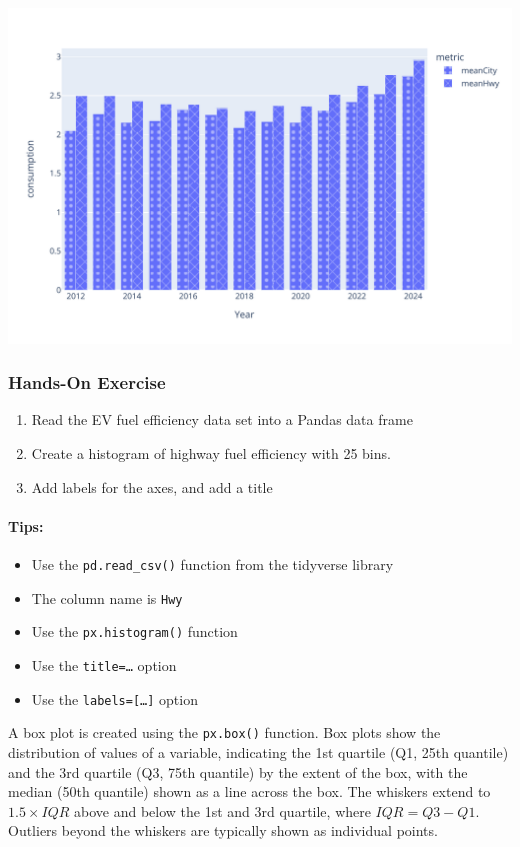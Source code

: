 \begin{center}
  \includegraphics[width=.8\textwidth]{px.fuel.columnsPatterns.pdf}
\end{center}


\begin{tcolorbox}[colback=code]
\subsubsection*{Hands-On Exercise}
\begin{enumerate}
    \item Read the EV fuel efficiency data set into a Pandas data frame
    \item Create a histogram of highway fuel efficiency with 25 bins.
    \item Add labels for the axes, and add a title
\end{enumerate}

\paragraph*{Tips:}
    \begin{itemize} 
	   \item Use the \texttt{pd.read\_csv()} function from the tidyverse library
       \item The column name is \texttt{Hwy}
       \item Use the \texttt{px.histogram()} function
       \item Use the \texttt{title=\ldots} option
       \item Use the \texttt{labels=[\ldots]} option
    \end{itemize}
\end{tcolorbox}

A box plot is created using the \texttt{px.box()} function. Box plots show the distribution of values of a variable, indicating the 1st quartile (Q1, 25th quantile) and the 3rd quartile (Q3, 75th quantile) by the extent of the box, with the median (50th quantile) shown as a line across the box. The whiskers extend to $1.5 \times IQR$ above and below the 1st and 3rd quartile, where $IQR = Q3-Q1$. Outliers beyond the whiskers are typically shown as individual points. 

